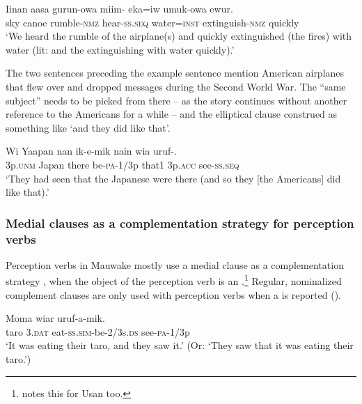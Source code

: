 \ea%
\label{ex:8:x1498}
\gll Iinan  aasa  gurun-owa  miim-  eka=iw  umuk-owa ewur. \\
sky  canoe  rumble-\textsc{nmz} hear-\textsc{ss}.\textsc{seq} water=\textsc{inst} extinguish-\textsc{nmz} quickly\\
\glt`We heard the rumble of the airplane(s) and quickly extinguished (the fires) with water (lit: and the extinguishing with water quickly).'
\z


The two sentences preceding the example sentence  mention American airplanes that flew over and dropped messages during the Second World War. The ``same subject'' needs to be picked from there -- as the story continues without another reference to the Americans for a while -- and the elliptical clause construed as something like  `and they did like that'.

\ea%
\label{ex:8:x1499}
\gll Wi  Yaapan  nan  ik-e-mik  nain  wia  uruf-.  \\
3p.\textsc{unm} Japan  there  be-\textsc{pa}-1/3p  that1  3p.\textsc{acc} see-\textsc{ss}.\textsc{seq}\\
\glt`They had seen that the Japanese were there (and so they [the Americans] did like that).'
\z


\subsubsection{Medial clauses as a complementation strategy for perception verbs} \label{sec:8.2.3.4}

Perception verbs in Mauwake mostly use a medial clause as a complementation strategy \citep[371]{Dixon2010a}, when the object of the perception verb is an .\footnote{\citet[237]{Reesink1983b} notes this for Usan too.} Regular, nominalized complement clauses are only used with perception verbs when a  is reported ().

\ea%
\label{ex:8:x1509}
\gll Moma  wiar    uruf-a-mik. \\
taro  3.\textsc{dat} eat-\textsc{ss}.\textsc{sim}-be-2/3s.\textsc{ds}  see-\textsc{pa}-1/3p      \\
\glt`It was eating their taro, and they saw it.' (Or: `They saw that it was eating their taro.')
\z


